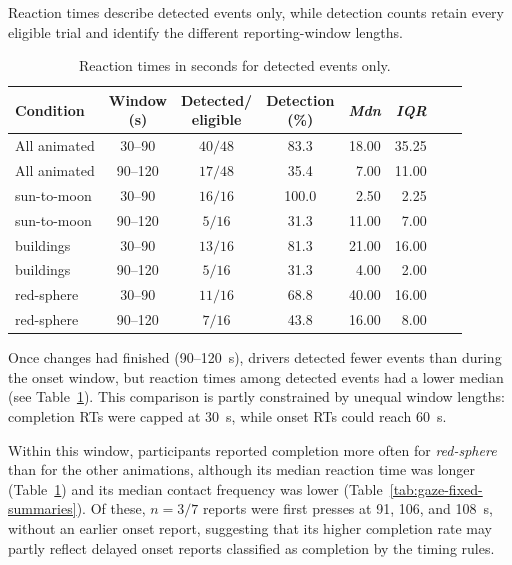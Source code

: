 \documentclass[
english,                 %
bibtex,                  %
includeExtraAbstracts, %
]{kththesis}
\newenvironment{evidenceblock}{\par\addvspace{6pt}\noindent\begin{minipage}{\linewidth}}{\end{minipage}\par\addvspace{6pt}}
\numberwithin{listing}{chapter}
\begin{document}
\begin{evidenceblock}
\normalsize
Reaction times describe detected events only, while detection counts retain every eligible trial and identify the different reporting-window lengths.

\begin{table}[htb]
\centering
\scriptsize
\caption[Reaction times in seconds for detected events only]{Reaction times in seconds for detected events only.}
\label{tab:rq1-detection-latency}
\setlength{\tabcolsep}{2pt}
\renewcommand{\arraystretch}{1.15}
\begin{tabularx}{\textwidth}{@{}>{\raggedright\arraybackslash}X c c c r r r r@{}}
\toprule
Condition & \shortstack{Window\\(s)} & \shortstack{Detected/\\eligible} & \shortstack{Detection\\(\%)} & \textit{Mdn} & \textit{IQR} \\
\midrule
All animated & 30--90 & $40/48$ & 83.3 & 18.00 & 35.25 \\
All animated & 90--120 & $17/48$ & 35.4 & 7.00 & 11.00 \\

sun-to-moon & 30--90 & $16/16$ & 100.0 & 2.50 & 2.25 \\
sun-to-moon & 90--120 & $5/16$ & 31.3 & 11.00 & 7.00 \\

buildings & 30--90 & $13/16$ & 81.3 & 21.00 & 16.00 \\
buildings & 90--120 & $5/16$ & 31.3 & 4.00 & 2.00 \\

red-sphere & 30--90 & $11/16$ & 68.8 & 40.00 & 16.00 \\
red-sphere & 90--120 & $7/16$ & 43.8 & 16.00 & 8.00 \\
\bottomrule
\end{tabularx}
\end{table}
\end{evidenceblock}

Once changes had finished (90--120~s), drivers detected fewer events than during the onset window, but reaction times among detected events had a lower median (see Table~\ref{tab:rq1-detection-latency}). This comparison is partly constrained by unequal window lengths: completion RTs were capped at 30~s, while onset RTs could reach 60~s.

Within this window, participants reported completion more often for \textit{red-sphere} than for the other animations, although its median reaction time was longer (Table~\ref{tab:rq1-detection-latency}) and its median contact frequency was lower (Table~\ref{tab:gaze-fixed-summaries}). Of these, $n = 3/7$ reports were first presses at 91, 106, and 108~s, without an earlier onset report, suggesting that its higher completion rate may partly reflect delayed onset reports classified as completion by the timing rules.
\end{document}
